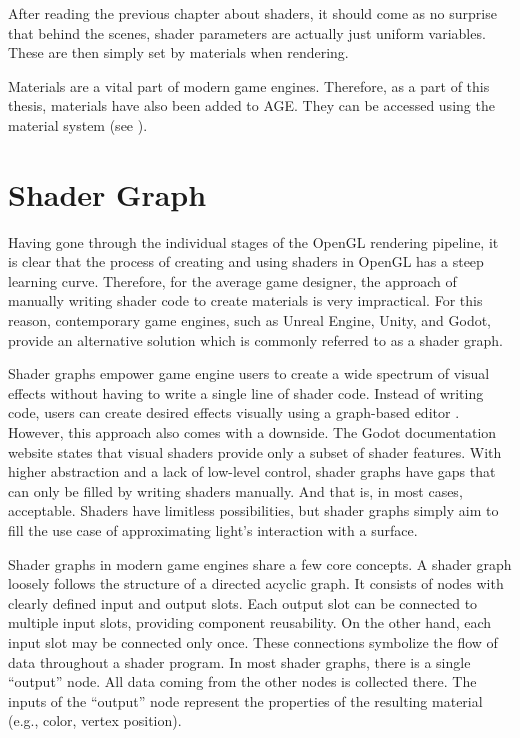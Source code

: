 \documentclass[
  digital,     %
  oneside,     %
  nosansbold,  %
  nocolorbold, %
  lof,         %
  lot,         %
]{fithesis4}
\begin{document}
After reading the previous chapter about shaders, it should come as no surprise that behind the scenes,
shader parameters are actually just uniform variables. These are then simply set by materials when rendering.

Materials are a vital part of modern game engines. Therefore, as a part of this thesis, materials have also been added to AGE.
They can be accessed using the material system (see \cite{material-system-hpp}).

\chapter{Shader Graph}
Having gone through the individual stages of the OpenGL rendering pipeline, it is clear that the process of creating and using
shaders in OpenGL has a steep learning curve. Therefore, for the average game designer,
the approach of manually writing shader code to create materials is very impractical.
For this reason, contemporary game engines,
such as Unreal Engine, Unity, and Godot, provide an alternative solution which is commonly referred to as a shader graph.

Shader graphs empower game engine users to create a wide spectrum of visual effects without having to write a single
line of shader code. Instead of writing code, users can create desired effects visually using a graph-based editor
\cite{unity-shader-graph}. However, this approach also comes with a downside. The Godot documentation website
\cite{godot-visual-shaders} states that visual shaders provide only a subset of shader features.
With higher abstraction and a lack of low-level control, shader graphs have gaps that can only be filled
by writing shaders manually. And that is, in most cases, acceptable. Shaders have limitless possibilities, but shader graphs simply
aim to fill the use case of approximating light's interaction with a surface.

Shader graphs in modern game engines share a few core concepts. A shader graph loosely follows the structure of
a directed acyclic graph. It consists of nodes with clearly defined input and output slots.
Each output slot can be connected to multiple input slots, providing component reusability.
On the other hand, each input slot may be connected only once. These connections symbolize the flow of data
throughout a shader program. In most shader graphs, there is a single \enquote{output} node.
All data coming from the other nodes is collected there. The inputs of the \enquote{output} node represent the properties
of the resulting material (e.g., color, vertex position).
\end{document}
